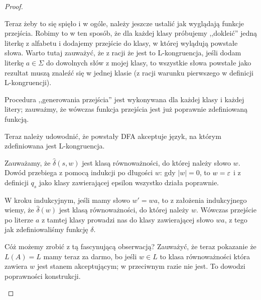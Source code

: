 \begin{proof}
\begin{description}
		      Teraz żeby to się spięło i w ogóle, należy jeszcze ustalić jak wyglądają funkcje przejścia. Robimy to w ten sposób, że dla każdej klasy próbujemy ,,dokleić'' jedną literkę z alfabetu i dodajemy przejście do klasy, w której wylądują powstałe słowa. Warto tutaj zauważyć, że z racji że jest to L-kongruencja, jeśli dodam literkę \(a \in \Sigma \) do dowolnych słów z mojej klasy, to wszystkie słowa powstałe jako rezultat muszą znaleźć się w jednej klasie (z racji warunku pierwszego w definicji L-kongruencji).

		      Procedura ,,generowania przejścia'' jest wykonywana dla każdej klasy i każdej litery; zauważmy, że wówczas funkcja przejścia jest już poprawnie zdefiniowaną funkcją.

		      Teraz należy udowodnić, że powstały DFA akceptuje język, na którym zdefiniowana jest L-kongruencja.

		      Zauważamy, że \(\hat\delta(s, w) \) jest klasą równoważności, do której należy słowo \(w\). Dowód przebiega z pomocą indukcji po długości \(w\): gdy \(|w| = 0\), to \( w = \varepsilon \) i z definicji \(q_s\) jako klasy zawierającej epsilon wszystko działa poprawnie.

		      W kroku indukcyjnym, jeśli mamy słowo \(w' = wa\), to z założenia indukcyjnego wiemy, że \(\hat\delta(w)\) jest klasą równoważności, do której należy \(w\). Wówczas przejście po literze \(a\) z tamtej klasy prowadzi nas do klasy zawierającej słowo \(wa\), z tego jak zdefiniowaliśmy funkcję \(\delta\).

		      Cóż możemy zrobić z tą fascynującą obserwacją? Zauważyć, że teraz pokazanie że \(L(A) = L\) mamy teraz za darmo, bo jeśli \(w \in L\) to klasa równoważności która zawiera \(w\) jest stanem akceptującym; w przeciwnym razie nie jest. To dowodzi poprawności konstrukcji.


	\end{description}
\end{proof}